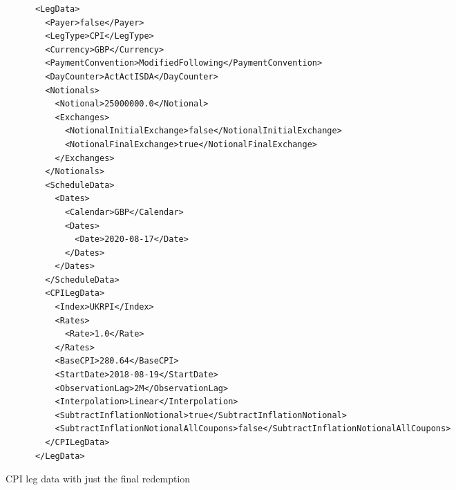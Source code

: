 \begin{listing}[H]
\begin{verbatim}
      <LegData>
        <Payer>false</Payer>
        <LegType>CPI</LegType>
        <Currency>GBP</Currency>
        <PaymentConvention>ModifiedFollowing</PaymentConvention>
        <DayCounter>ActActISDA</DayCounter>
        <Notionals>
          <Notional>25000000.0</Notional>
          <Exchanges>
            <NotionalInitialExchange>false</NotionalInitialExchange>
            <NotionalFinalExchange>true</NotionalFinalExchange>
          </Exchanges>
        </Notionals>
        <ScheduleData>
          <Dates>
            <Calendar>GBP</Calendar>
            <Dates>
              <Date>2020-08-17</Date>
            </Dates>
          </Dates>
        </ScheduleData>
        <CPILegData>
          <Index>UKRPI</Index>
          <Rates>
            <Rate>1.0</Rate>
          </Rates>
          <BaseCPI>280.64</BaseCPI>
          <StartDate>2018-08-19</StartDate>
          <ObservationLag>2M</ObservationLag>
          <Interpolation>Linear</Interpolation>
          <SubtractInflationNotional>true</SubtractInflationNotional>
          <SubtractInflationNotionalAllCoupons>false</SubtractInflationNotionalAllCoupons>
        </CPILegData>
      </LegData>
\end{verbatim}
\caption{CPI leg data with just the final redemption}
\label{lst:cpilegdatafinal}
\end{listing}

